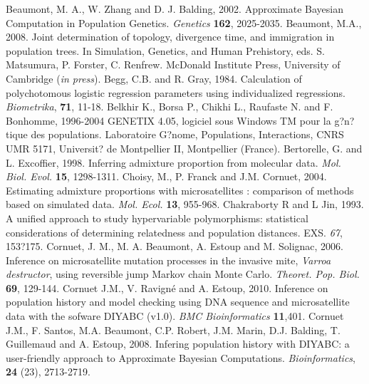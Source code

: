\begin{thebibliography}{a}
 Beaumont, M. A., W. Zhang and D. J. Balding, 2002. Approximate Bayesian Computation in Population Genetics. \emph{Genetics} \textbf{162}, 2025-2035.
Beaumont, M.A., 2008. Joint determination of topology, divergence time, and immigration in population trees. In Simulation, Genetics, and Human Prehistory, eds. S. Matsumura, P. Forster,  C. Renfrew. McDonald Institute Press, University of Cambridge (\emph{in press}).
 Begg, C.B. and R. Gray, 1984. Calculation of polychotomous logistic regression parameters using individualized regressions. \emph{Biometrika},
\textbf{71}, 11-18.
 Belkhir K., Borsa P., Chikhi L., Raufaste N. and F. Bonhomme, 1996-2004 GENETIX 4.05, logiciel sous Windows TM pour la g?n?tique des populations. Laboratoire G?nome, Populations, Interactions, CNRS UMR 5171, Universit? de Montpellier II, Montpellier (France).
 Bertorelle, G. and L. Excoffier, 1998. Inferring admixture proportion from molecular data. \emph{Mol. Biol. Evol.} \textbf{15}, 1298-1311.
 Choisy, M., P. Franck and J.M. Cornuet, 2004. Estimating admixture proportions with microsatellites : comparison of methods based on simulated data. \emph{Mol. Ecol.} \textbf{13}, 955-968.
Chakraborty R and L Jin, 1993. A unified approach to study hypervariable polymorphisms: statistical considerations of determining relatedness and population distances. EXS. \emph{67}, 153?175.
 Cornuet, J. M.,
M. A. Beaumont, A. Estoup and M. Solignac, 2006. Inference on
microsatellite mutation processes in the invasive mite, \emph{Varroa
destructor}, using reversible jump Markov chain Monte Carlo.
\emph{Theoret. Pop. Biol.} \textbf{69}, 129-144.
Cornuet J.M., V. Ravign\'e and A. Estoup, 2010. Inference on population history and model checking using DNA sequence and microsatellite data with the sofware DIYABC (v1.0). \emph{BMC Bioinformatics} \textbf{11},401. 
Cornuet J.M., F. Santos, M.A. Beaumont, C.P. Robert, J.M. Marin, D.J. Balding, T. Guillemaud and A. Estoup, 2008. Infering population history with DIYABC: a user-friendly approach to Approximate Bayesian Computations. \emph{Bioinformatics}, \textbf{24} (23), 2713-2719.


\end{thebibliography}
